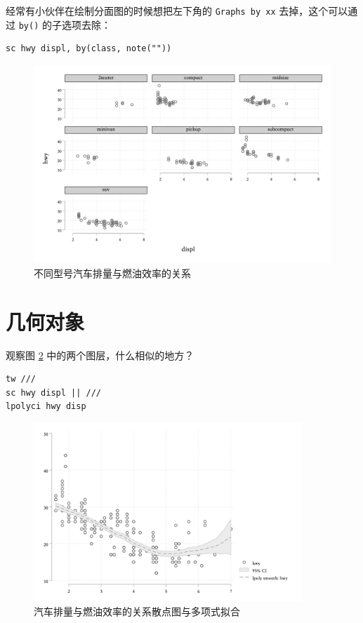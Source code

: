 \documentclass[]{ctexbook}
\begin{document}
经常有小伙伴在绘制分面图的时候想把左下角的 \texttt{Graphs\ by\ xx} 去掉，这个可以通过 \texttt{by()} 的子选项去除：

\begin{lstlisting}
sc hwy displ, by(class, note(""))
\end{lstlisting}

\begin{figure}

{\centering \includegraphics[width=1\textwidth]{assets/hwydisplbyclass3} 

}

\caption{不同型号汽车排量与燃油效率的关系}\label{fig:hwydisplbyclass3}
\end{figure}

\hypertarget{section-33}{%
\section{几何对象}\label{section-33}}

观察图 \ref{fig:lpolychwydisp} 中的两个图层，什么相似的地方？

\begin{lstlisting}
tw ///
sc hwy displ || ///
lpolyci hwy disp
\end{lstlisting}

\begin{figure}

{\centering \includegraphics[width=0.9\textwidth]{assets/lpolychwydisp} 

}

\caption{汽车排量与燃油效率的关系散点图与多项式拟合}\label{fig:lpolychwydisp}
\end{figure}
\end{document}
